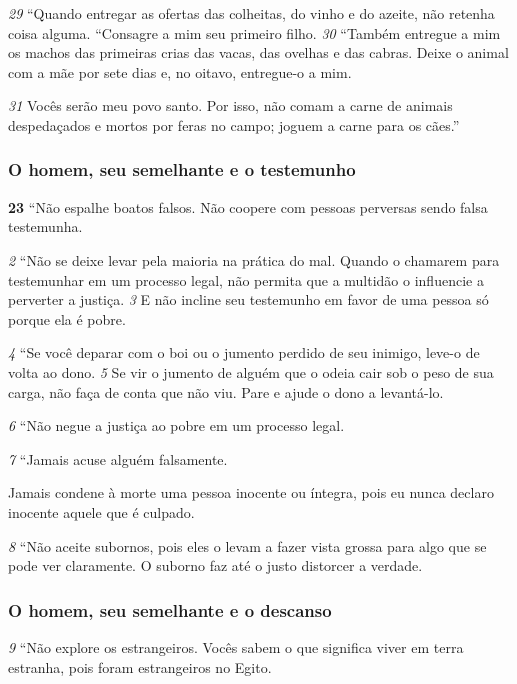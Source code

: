\smallskip
\textit{\tiny 29}
“Quando entregar as ofertas das colheitas, do vinho e do azeite, não retenha
coisa alguma.
   “Consagre a mim seu primeiro filho.
\textit{\tiny 30}
“Também entregue a mim os machos das primeiras crias das vacas, das
ovelhas e das cabras. Deixe o animal com a mãe por sete dias e, no oitavo,
entregue-o a mim.

\smallskip
\textit{\tiny 31}
Vocês serão meu povo santo. Por isso, não comam a carne de animais
despedaçados e mortos por feras no campo; joguem a carne para os cães.”
 
\bigskip
\subsubsection*{O homem, seu semelhante e o testemunho}
\textbf{\large 23}
 “Não espalhe boatos falsos. Não coopere com pessoas perversas sendo
falsa testemunha. 

\smallskip
\textit{\tiny 2} 
“Não se deixe levar pela maioria na prática do mal. Quando o chamarem para
testemunhar em um processo legal, não permita que a multidão o influencie a
perverter a justiça. 
\textit{\tiny 3} 
E não incline seu testemunho em favor de uma pessoa só
porque ela é pobre. 

\smallskip
\textit{\tiny 4} 
“Se você deparar com o boi ou o jumento perdido de seu inimigo, leve-o de
volta ao dono. 
\textit{\tiny 5} 
Se vir o jumento de alguém que o odeia cair sob o peso de sua
carga, não faça de conta que não viu. Pare e ajude o dono a levantá-lo. 

\smallskip
\textit{\tiny 6} 
“Não negue a justiça ao pobre em um processo legal. 

\smallskip
\textit{\tiny 7} 
“Jamais acuse alguém falsamente. 

\smallskip
Jamais condene à morte uma pessoa
inocente ou íntegra, pois eu nunca declaro inocente aquele que é culpado. 

\smallskip
\textit{\tiny 8} 
“Não aceite subornos, pois eles o levam a fazer vista grossa para algo que se
pode ver claramente. O suborno faz até o justo distorcer a verdade. 

\bigskip
\subsubsection*{O homem, seu semelhante e o descanso}
\textit{\tiny 9} 
“Não explore os estrangeiros. Vocês sabem o que significa viver em terra
estranha, pois foram estrangeiros no Egito.
   
